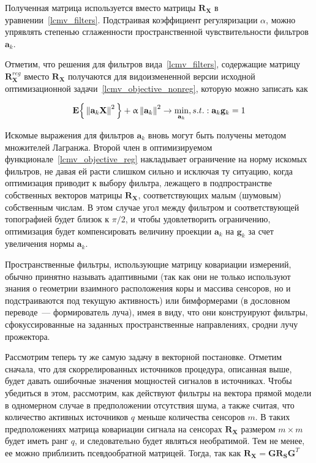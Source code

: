 Полученная матрица используется вместо матрицы $\mathbf{R}_\mathbf{X}$ в
уравнении~\ref{lcmv_filters}. Подстраивая коэффициент регуляризации $\alpha$, можно упрявлять степенью
сглаженности пространственной чувствительности фильтров $\mathbf{a}_k$.


Отметим, что решения для фильтров вида~\ref{lcmv_filters},
содержащие матрицу $\mathbf{R}_\mathbf{X}^{reg}$ вместо $\mathbf{R}_\mathbf{X}$ получаются для
видоизмененной версии исходной оптимизационной задачи~\ref{lcmv_objective_nonreg},
которую можно записать как

\begin{equation}
    \mathbf{E}\Big\{\left\lVert\mathbf{a}_k \mathbf{X}\right\rVert^2\Big\} + \upalpha \left\lVert\mathbf{a}_k\right\rVert^2
    \rightarrow \underset{\mathbf{a}_k}{\min},
    s.t.: \mathbf{a}_k \mathbf{g}_k = 1
    \label{lcmv_objective_reg}
\end{equation}

Искомые выражения для фильтров $\mathbf{a}_k$ вновь могут быть получены методом множителей Лагранжа.
Второй член в оптимизируемом функционале~\ref{lcmv_objective_reg} накладывает ограничение на
норму искомых фильтров, не давая ей расти слишком сильно и исключая ту ситуацию,
когда оптимизация приводит к выбору фильтра, лежащего в подпространстве собственных
векторов матрицы $\mathbf{R}_\mathbf{X}$, соответствующих малым (шумовым) собственным числам.
В этом случае угол между фильтром и соответствующей топографией будет близок к $\pi/2$,
и чтобы удовлетворить ограничению, оптимизация будет компенсировать величину проекции
$\mathbf{a}_k$ на $\mathbf{g}_k$ за счет увеличения нормы $\mathbf{a}_k$.

Пространственные фильтры, использующие матрицу ковариации измерений,
обычно принятно называть адаптивными
(так как они не только используют знания о геометрии взаимного расположения коры и массива сенсоров,
но и подстраиваются под текущую активность) или
бимформерами (в дословном переводе~--- формирователь луча),
имея в виду, что они конструируют фильтры,
сфокуссированные на заданных пространственные направлениях, сродни лучу прожектора.

Рассмотрим теперь ту же самую задачу в векторной постановке.
Отметим сначала, что для скоррелированных источников процедура, описанная
выше, будет давать ошибочные значения мощностей сигналов в источниках.
Чтобы убедиться в этом, рассмотрим, как действуют фильтры на вектора прямой модели
в одномерном случае в предположении отсутствия шума,
а также считая, что количество активных источников $q$ меньше количества сенсоров $m$.
В таких предположениях матрица ковариации сигнала на сенсорах $\mathbf{R}_{\mathbf{X}}$
размером $m\times m$ будет иметь ранг $q$, и следовательно будет являться необратимой.
Тем не менее, ее можно приблизить псевдообратной матрицей.
Тогда, так как $\mathbf{R}_\mathbf{X} = \mathbf{G} \mathbf{R}_\mathbf{S} \mathbf{G}^T$

